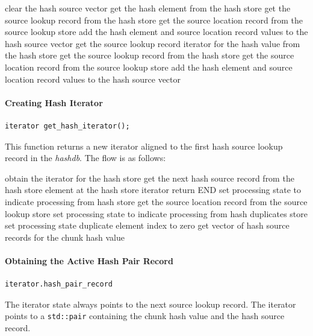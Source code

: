 \documentclass[12pt,twoside]{article}
\newcommand{\hdb}{\emph{hashdb}\xspace}
\begin{document}
\begin{algorithmic}
\STATE clear the hash source vector
  \RETURN \FALSE
\ENDIF
\STATE get the hash element from the hash store
  \STATE get the source lookup record from the hash store
  \STATE get the source location record from the source lookup store
  \STATE add the hash element and source location record values to the hash source vector
  \RETURN \TRUE
\ELSE
  \STATE get the source lookup record iterator for the hash value from the hash store
    \STATE get the source lookup record from the hash store
    \STATE get the source location record from the source lookup store
    \STATE add the hash element and source location record values to the hash source vector
  \ENDFOR
  \RETURN \TRUE
\ENDIF
\end{algorithmic}

\paragraph{Creating Hash Iterator}
\begin{small}
\begin{verbatim}
iterator get_hash_iterator();
\end{verbatim}
\end{small}
This function returns a new iterator aligned to the first hash source lookup record in the \hdb.
The flow is as follows:

\begin{algorithmic}
\STATE obtain the iterator for the hash store
\STATE get the next hash source record from the hash store element at the hash store iterator
  \STATE return END
\ELSE
    \STATE set processing state to indicate processing from hash store
    \STATE get the source location record from the source lookup store
  \ELSE
    \STATE set processing state to indicate processing from hash duplicates store
    \STATE set processing state duplicate element index to zero
    \STATE get vector of hash source records for the chunk hash value
  \ENDIF
\ENDIF
\end{algorithmic}

\paragraph{Obtaining the Active Hash Pair Record}
\begin{small}
\begin{verbatim}
iterator.hash_pair_record
\end{verbatim}
\end{small}
The iterator state always points to the next source lookup record.
The iterator points to a \texttt{std::pair}
containing the chunk hash value and the hash source record.
\end{document}
